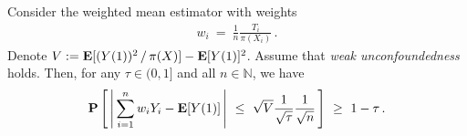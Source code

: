 \begin{theorem*}
  Consider the weighted mean estimator with weights
  \begin{gather}
    w_i
    \ 
    =
    \ 
    \frac{1}{n}
    \frac{T_i}{\pi(X_i)}
    \,.
  \end{gather}
  Denote
  $
    V:=
    \mathbf{E}[
    (
      Y(1)
    )^2
    \,/\,
    \pi(X)
    ]
    -
    \mathbf{E}[Y(1)]^2
  $.  
  Assume that \textit{weak unconfoundedness} holds.
  Then, for any $\tau \in (0,1]$ and all $n\in\mathbb{N}$, we have
  \begin{gather}
   \P
   \left[
     \,
     \left| 
     \,
   \sum_{i=1}^{n}
   w_iY_i - \E[Y(1)]
   \,
     \right|
     \ 
     \le
     \ 
     \sqrt{V}
     \frac{1}{\sqrt{\tau}}
     \frac{1}{\sqrt{n}}
     \,
   \right]
   \ 
   \ge
   \ 
   1-\tau\,.
  \end{gather}

\end{theorem*}
